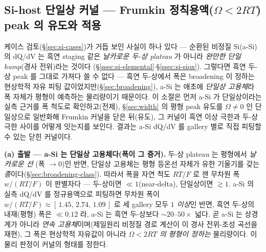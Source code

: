 \subsection{Si-host 단일상 커널 --- Frumkin 정칙용액($\Omega<2RT$) peak 의 유도와 적용}\label{ssec:si-frumkin}
케이스 검토(\S\ref{sec:si-cases})가 거듭 보인 사실이 하나 있다 --- 순환된 비정질 Si(a-Si)의 dQ/dV 는 흑연
staging 같은 \emph{날카로운 두-상 plateau} 가 아니라 \emph{완만한 단일 hump}(경사 전위)라는 것이다
(\S\ref{ssec:si-elemental}$\cdot$\S\ref{ssec:si-siox}). 그렇다면 흑연 두-상 peak 를 그대로 가져다 쓸 수 없다 ---
흑연 두-상에서 폭은 broadening 이 정하는 현상학적 자유 피팅 값이었지만(\S\ref{sec:broadening}), a-Si 는 애초에
\emph{단일상 고용체}라 폭 자체가 평형이 예측하는 물리량이기 때문이다. 이 소절은 먼저 a-Si 가 단일상이라는
실측 근거를 폭 척도로 확인하고(전제), \S\ref{sec:width} 의 평형 peak 유도를 $\Omega\neq0$ 인 단일상으로
일반화해 Frumkin 커널을 닫은 뒤(유도), 그 커널이 흑연 이상 극한과 두-상 극한 사이를 어떻게 잇는지를 보인다.
결과는 a-Si dQ/dV 를 gallery 별로 직접 피팅할 수 있는 닫힌 커널이다.

\textbf{(a) 출발 --- a-Si 는 단일상 고용체다(폭이 그 증거).} 두-상 plateau 는 평형에서 \emph{날카로운 선}
(폭 $\to0$)인 반면, 단일상 고용체는 평형 등온선 자체가 유한 기울기를 갖는 \emph{종}이다(\S\ref{sec:broadening-class}).
따라서 폭을 자연 척도 $RT/F$ 로 잰 무차원 폭 $w/(RT/F)$ 이 판별자다 --- 두-상이면 $\ll1$(near-delta), 단일상이면
$\gtrsim1$. a-Si 의 실측 dQ/dV 를 정규용액으로 피팅하면 무차원 폭이
$w/(RT/F)\approx[\,1.45,\,2.74,\,1.09\,]$ 로 세 gallery 모두 \emph{$1$ 이상}인 반면, 흑연 두-상의 내재(평형)
폭은 $\ll0.12$ 라, a-Si 는 흑연 두-상보다 $\sim$$20$--$50\times$ 넓다. 곧 a-Si 는 상경계가 아니라 \emph{연속
고용체}이며(제일원리 비정질 경로 계산이 이 경사 전위-조성 곡선을 재현\cite{chevrier_dahn2009}), 그 폭은
현상학적 자유값이 아니라 \emph{$\Omega<2RT$ 의 평형이 정하는} 물리량이다. 이 물리 판정이 커널의 형태를 정한다.

